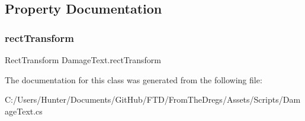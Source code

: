 \subsection{Property Documentation}
\mbox{\label{class_damage_text_ae6860819b6715004f9f05314039aa978}} 
\subsubsection{\texorpdfstring{rectTransform}{rectTransform}}
{\footnotesize\ttfamily Rect\+Transform Damage\+Text.\+rect\+Transform\hspace{0.3cm}{\ttfamily [get]}}



The documentation for this class was generated from the following file\+:\begin{DoxyCompactItemize}
\item 
C\+:/\+Users/\+Hunter/\+Documents/\+Git\+Hub/\+F\+T\+D/\+From\+The\+Dregs/\+Assets/\+Scripts/Damage\+Text.\+cs\end{DoxyCompactItemize}
